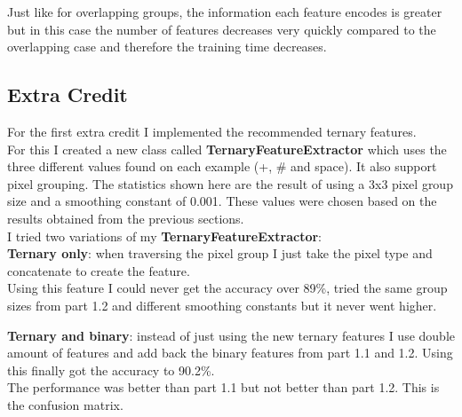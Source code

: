 \documentclass[11pt]{article}
\begin{document}
Just like for overlapping groups, the information each feature encodes is greater but in this case the number of features decreases very quickly compared to the overlapping case and therefore the training time decreases.

\subsection*{Extra Credit}
For the first extra credit I implemented the recommended ternary features. \\
For this I created a new class called \textbf{TernaryFeatureExtractor} which uses the three different values found on each example (+, \# and space). It also support pixel grouping. The statistics shown here are the result of using a 3x3 pixel group size and a smoothing constant of 0.001. These values were chosen based on the results obtained from the previous sections.\\

I tried two variations of my \textbf{TernaryFeatureExtractor}:\\
\textbf{Ternary only}: when traversing the pixel group I just take the pixel type and concatenate to create the feature.\\
Using this feature I could never get the accuracy over 89\%, tried the same group sizes from part 1.2 and different smoothing constants but it never went higher.

\textbf{Ternary and binary}: instead of just using the new ternary features I use double amount of features and add back the binary features from part 1.1 and 1.2. Using this finally got the accuracy to 90.2\%. \\

The performance was better than part 1.1 but not better than part 1.2. This is the confusion matrix.\\
\end{document}
